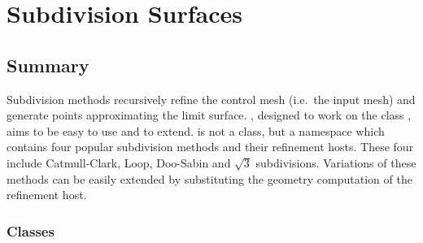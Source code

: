 
\chapter{Subdivision Surfaces}
\label{chapterSubdivisionRef}


\section*{Summary}

Subdivision methods recursively refine the control mesh 
(i.e.~the input mesh) and generate points approximating 
the limit surface. 
, designed to work on the class 
, aims to be easy to use and to extend.
 is not a class, but a namespace 
which contains four popular subdivision methods and their refinement
hosts. These four include Catmull-Clark, Loop, Doo-Sabin and 
$\sqrt{3}$ subdivisions. Variations of these methods can be easily 
extended by substituting the geometry computation of the refinement
host.


\subsection*{Classes}


